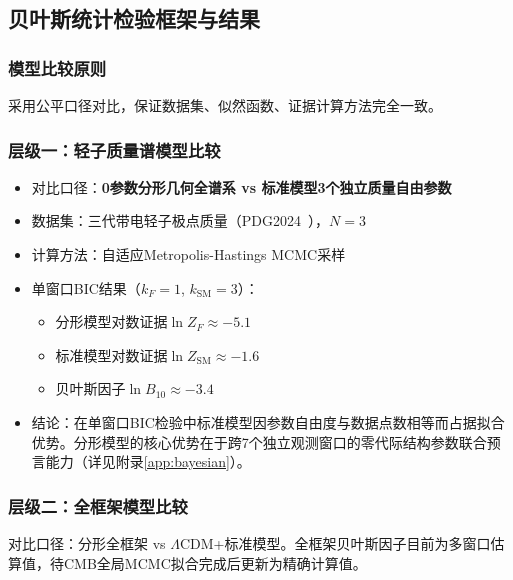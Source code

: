 \documentclass[12pt,a4paper,twocolumn]{article}
\begin{document}
\subsection{贝叶斯统计检验框架与结果}
\subsubsection{模型比较原则}
采用公平口径对比，保证数据集、似然函数、证据计算方法完全一致。

\subsubsection{层级一：轻子质量谱模型比较}
\begin{itemize}
\item 对比口径：\textbf{0参数分形几何全谱系 vs 标准模型3个独立质量自由参数}
\item 数据集：三代带电轻子极点质量（PDG2024~\cite{PDG2024}），$N=3$
\item 计算方法：自适应Metropolis-Hastings MCMC采样
\item 单窗口BIC结果（$k_F=1$, $k_{\text{SM}}=3$）：
  \begin{itemize}
  \item 分形模型对数证据$\ln Z_F \approx -5.1$
  \item 标准模型对数证据$\ln Z_{\text{SM}} \approx -1.6$
  \item 贝叶斯因子$\ln B_{10} \approx -3.4$
  \end{itemize}
\item 结论：在单窗口BIC检验中标准模型因参数自由度与数据点数相等而占据拟合优势。分形模型的核心优势在于跨7个独立观测窗口的零代际结构参数联合预言能力（详见附录\ref{app:bayesian}）。
\end{itemize}

\subsubsection{层级二：全框架模型比较}
对比口径：分形全框架 vs $\Lambda$CDM+标准模型。全框架贝叶斯因子目前为多窗口估算值，待CMB全局MCMC拟合完成后更新为精确计算值。
\end{document}
